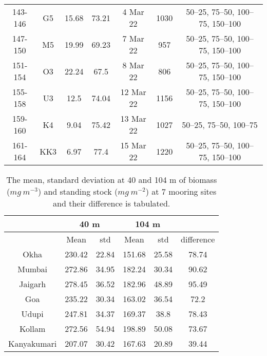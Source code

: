 \documentclass{article}
\begin{document}
\begin{table}[htbp]
{\begin{adjustwidth}{0in}{0in}
\begin{tabular}{ccccccc}
				143-146       & G5  & 15.68      & 73.21      & 4 Mar 22                  & 1030       & 50–25, 75–50, 100–75, 150–100 \\
				147-150       & M5  & 19.99      & 69.23      & 7 Mar 22                  & 957        & 50–25, 75–50, 100–75, 150–100 \\
				151-154       & O3  & 22.24      & 67.5       & 8 Mar 22                  & 806        & 50–25, 75–50, 100–75, 150–100 \\
				155-158       & U3  & 12.5       & 74.04      & 12 Mar 22                 & 1156       & 50–25, 75–50, 100–75, 150–100 \\
				159-160       & K4  & 9.04       & 75.42      & 13 Mar 22                 & 1027       & 50–25, 75–50, 100–75          \\
				161-164       & KK3 & 6.97       & 77.4       & 15 Mar 22                 & 1220       & 50–25, 75–50, 100–75, 150–100
				\\ 
				\bottomrule
			\end{tabular}
		\end{adjustwidth}
		\label{tab:table2}
	}
\end{table}

\newpage
\begin{table}[t]
	
	{\footnotesize
		\captionsetup{justification=justified,font=footnotesize,skip=0.05\baselineskip,width*=\columnwidth} %
		\caption{\newline The mean, standard deviation at 40 and 104 m of biomass ($mg \ m^{-3}$) and standing stock ($mg \ m^{-2}$) at 7 mooring sites and their difference is tabulated.}
	\begin{adjustwidth}{0in}{0in} 
	\begin{tabular}{cccccc}
		\toprule
		& \multicolumn{2}{c}{40 m} & \multicolumn{2}{c}{104 m} &            \\ \hline
            		& Mean        & std        & Mean         & std        & difference \\ \hline
		Okha        & 230.42      & 22.84      & 151.68       & 25.58      & 78.74      \\
		Mumbai      & 272.86      & 34.95      & 182.24       & 30.34      & 90.62      \\
		Jaigarh     & 278.45      & 36.52      & 182.96       & 48.89      & 95.49      \\
		Goa         & 235.22      & 30.34      & 163.02       & 36.54      & 72.2       \\
		Udupi       & 247.81      & 34.37      & 169.37       & 38.8       & 78.43      \\
		Kollam      & 272.56      & 54.94      & 198.89       & 50.08      & 73.67      \\
		Kanyakumari & 207.07      & 30.42      & 167.63       & 20.89      & 39.44  \\ \bottomrule  
	\end{tabular}
	\end{adjustwidth}
    \label{tab:table3}
    }
\end{table}
\end{document}

